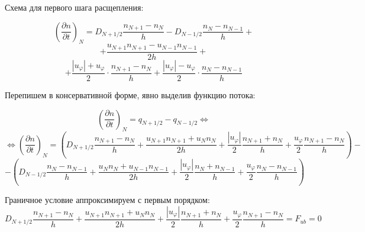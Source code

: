 \documentclass[2pt, a4paper, fleqn]{extarticle}
\begin{document}
Схема для первого шага расщепления:

$$\left(\dfrac{\partial n}{\partial t}\right)_N = D_{N+1/2}\dfrac{n_{N+1}-n_N}{h} - D_{N-1/2}\dfrac{n_{N}-n_{N-1}}{h}+$$ $$+\dfrac{u_{N+1}n_{N+1}-u_{N-1}n_{N-1}}{2h} + $$ $$+\dfrac{|u_\varphi|+u_\varphi}{2}\cdot\dfrac{n_{N+1}-n_N}{h}+\dfrac{|u_\varphi|-u_\varphi}{2}\cdot\dfrac{n_N-n_{N-1}}{h}$$

Перепишем в консервативной форме, явно выделив функцию потока:

$$\left(\dfrac{\partial n}{\partial t}\right)_N = q_{N+1/2}-q_{N-1/2} \Leftrightarrow $$ $$\Leftrightarrow \left(\dfrac{\partial n}{\partial t}\right)_N = \left(D_{N+1/2}\dfrac{n_{N+1}-n_N}{h} + \dfrac{u_{N+1}n_{N+1}+u_Nn_N}{2h}+\dfrac{|u_\varphi|}{2}\dfrac{n_{N+1}+n_{N}}{h}+\dfrac{u_\varphi}{2}\dfrac{n_{N+1}-n_N}{h}\right) - $$ $$ - \left(D_{N-1/2}\dfrac{n_{N}-n_{N-1}}{h} + \dfrac{u_{N}n_{N}+u_{N-1}n_{N-1}}{2h}+\dfrac{|u_\varphi|}{2}\dfrac{n_{N}+n_{N-1}}{h}+\dfrac{u_\varphi}{2}\dfrac{n_{N}-n_{N-1}}{h}\right)$$

Граничное условие аппроксимируем с первым порядком: $$D_{N+1/2}\dfrac{n_{N+1}-n_N}{h}+\dfrac{u_{N+1}n_{N+1}+u_Nn_N}{2h}+\dfrac{|u_\varphi|}{2}\dfrac{n_{N+1}+n_{N}}{h}+\dfrac{u_\varphi}{2}\dfrac{n_{N+1}-n_N}{h} = F_{ub} = 0$$
\end{document}
